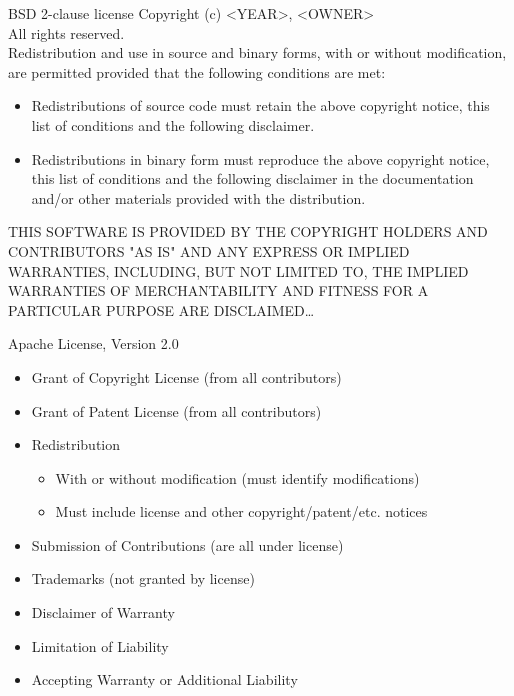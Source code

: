 \documentclass{beamer}
\begin{document}
\begin{frame}{BSD 2-clause license \hfill\href{http://opensource.org/licenses/BSD-2-Clause}{}}
Copyright (c) <YEAR>, <OWNER>\\
All rights reserved.\\
\medskip
Redistribution and use in source and binary forms, with or without modification, are permitted provided that the following conditions are met:\\
\begin{itemize}
\item Redistributions of source code must retain the above copyright notice, this list of conditions and the following disclaimer.
\item Redistributions in binary form must reproduce the above copyright notice, this list of conditions and the following disclaimer in the documentation and/or other materials provided with the distribution.
\end{itemize}
THIS SOFTWARE IS PROVIDED BY THE COPYRIGHT HOLDERS AND CONTRIBUTORS "AS IS" AND ANY EXPRESS OR IMPLIED WARRANTIES, INCLUDING, BUT NOT LIMITED TO, THE IMPLIED WARRANTIES OF MERCHANTABILITY AND FITNESS FOR A PARTICULAR PURPOSE ARE DISCLAIMED\ldots
\end{frame}

\begin{frame}{Apache License, Version 2.0 \hfill\href{http://www.apache.org/licenses/LICENSE-2.0.html}{}}
\begin{itemize}
\item Grant of Copyright License (from all contributors)
\item Grant of Patent License (from all contributors)
\item Redistribution
\begin{itemize}
\item With or without modification (must identify modifications)
\item Must include license and other copyright/patent/etc. notices
\end{itemize}
\item Submission of Contributions (are all under license)
\item Trademarks (not granted by license)
\item Disclaimer of Warranty
\item Limitation of Liability
\item Accepting Warranty or Additional Liability
\end{itemize}
\end{frame}
\end{document}
